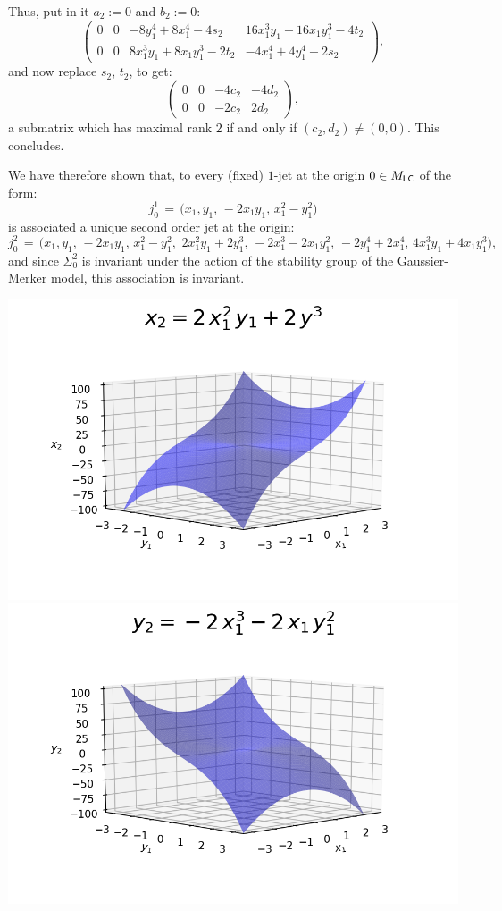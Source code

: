\documentclass[12pt,twoside,leqno,openany]{amsart}
\begin{document}
Thus, put in it $a_2 := 0$ and $b_2 := 0$:
\[
\left(\!
\begin{array}{cccc}
0 & 0 & -8y_1^4+8x_1^4-4s_2 & 
16x_1^3y_1+16x_1y_1^3-4t_2
\\
0 & 0 & 8x_1^3y_1+8x_1y_1^3-2t_2 &
-4x_1^4+4y_1^4+2s_2
\end{array}
\!\right),
\]
and now replace $s_2$, $t_2$, to get:
\[
\left(\!
\begin{array}{cccc}
0 & 0 & -4c_2 & -4d_2
\\
0 & 0 & -2c_2 & 2d_2
\end{array}
\!\right),
\]
a submatrix which has maximal rank $2$ 
if and only if $(c_2, d_2) \neq (0, 0)$.
This concludes.
\endproof

We have therefore shown that, to every (fixed) $1$-jet
at the origin $0 \in M_{\sf LC}$
of the form:
\[
j_0^1 
\,=\, 
\big(
x_1,y_1,\,
-2x_1y_1,\,
x_1^2-y_1^2
\big)
\] 
is associated a unique
second order jet at the origin:
\[
j_0^2
\,=\,
\Big(
x_1,y_1,\,
-2x_1y_1,\,
x_1^2-y_1^2,\,\,
2x_1^2y_1+2y_1^3,\,
-2x_1^3-2x_1y_1^2,\,
-2y_1^4+2x_1^4,\,
4x_1^3y_1+4x_1y_1^3
\Big),
\]
and since $\Sigma_0^2$ is invariant under the
action of the stability group
of the Gaussier-Merker model, 
this association is invariant.

\begin{center}
\includegraphics[scale=0.50]{jm3.png}
\!\!\!\!\!\!\!\!\!\!
\includegraphics[scale=0.50]{jm4.png}
\end{center}
\end{document}
